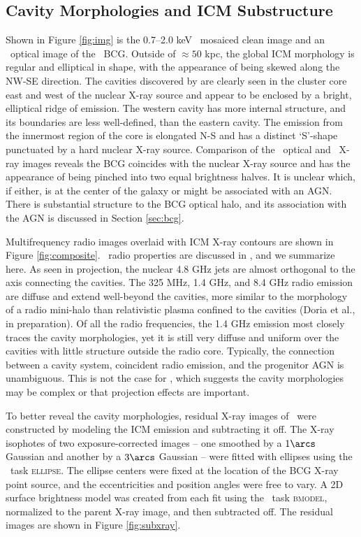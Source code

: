 \documentclass[iop]{emulateapj}
\begin{document}
\subsection{Cavity Morphologies and ICM Substructure}
\label{sec:morph}

Shown in Figure \ref{fig:img} is the 0.7--2.0 keV \cxo\ mosaiced clean
image and an \hst\ optical image of the \rbs\ BCG. Outside of $\approx
50$ kpc, the global ICM morphology is regular and elliptical in shape,
with the appearance of being skewed along the NW-SE direction. The
cavities discovered by \citet{schindler01} are clearly seen in the
cluster core east and west of the nuclear X-ray source and appear to
be enclosed by a bright, elliptical ridge of emission. The western
cavity has more internal structure, and its boundaries are less
well-defined, than the eastern cavity. The emission from the innermost
region of the core is elongated N-S and has a distinct `S'-shape
punctuated by a hard nuclear X-ray source. Comparison of the
\hst\ optical and \cxo\ X-ray images reveals the BCG coincides with
the nuclear X-ray source and has the appearance of being pinched into
two equal brightness halves. It is unclear which, if either, is at the
center of the galaxy or might be associated with an AGN. There is
substantial structure to the BCG optical halo, and its association
with the AGN is discussed in Section \ref{sec:bcg}.

Multifrequency radio images overlaid with ICM X-ray contours are shown
in Figure \ref{fig:composite}. \rbs\ radio properties are discussed in
\citet{gitti06}, and we summarize here. As seen in projection, the
nuclear 4.8 GHz jets are almost orthogonal to the axis connecting the
cavities. The 325 MHz, 1.4 GHz, and 8.4 GHz radio emission are diffuse
and extend well-beyond the cavities, more similar to the morphology of
a radio mini-halo than relativistic plasma confined to the cavities
(Doria et al., in preparation). Of all the radio frequencies, the 1.4
GHz emission most closely traces the cavity morphologies, yet it is
still very diffuse and uniform over the cavities with little structure
outside the radio core. Typically, the connection between a cavity
system, coincident radio emission, and the progenitor AGN is
unambiguous. This is not the case for \rbs, which suggests the cavity
morphologies may be complex or that projection effects are
important.

To better reveal the cavity morphologies, residual X-ray images of
\rbs\ were constructed by modeling the ICM emission and subtracting it
off. The X-ray isophotes of two exposure-corrected images -- one
smoothed by a $1\arcs$ Gaussian and another by a $3\arcs$ Gaussian --
were fitted with ellipses using the \iraf\ task \textsc{ellipse}. The
ellipse centers were fixed at the location of the BCG X-ray point
source, and the eccentricities and position angles were free to
vary. A 2D surface brightness model was created from each fit using
the \iraf\ task \textsc{bmodel}, normalized to the parent X-ray image,
and then subtracted off. The residual images are shown in Figure
\ref{fig:subxray}.
\end{document}
